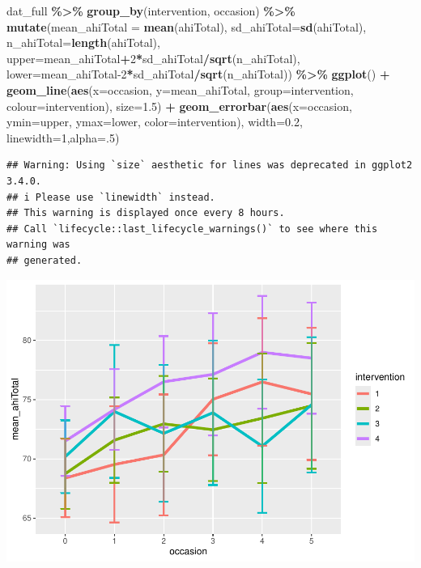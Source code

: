 \documentclass[
]{article}
\newenvironment{Shaded}{\begin{snugshade}}{\end{snugshade}}
\newcommand{\AttributeTok}[1]{\textcolor[rgb]{0.13,0.29,0.53}{#1}}
\newcommand{\DecValTok}[1]{\textcolor[rgb]{0.00,0.00,0.81}{#1}}
\newcommand{\FloatTok}[1]{\textcolor[rgb]{0.00,0.00,0.81}{#1}}
\newcommand{\FunctionTok}[1]{\textcolor[rgb]{0.13,0.29,0.53}{\textbf{#1}}}
\newcommand{\NormalTok}[1]{#1}
\newcommand{\SpecialCharTok}[1]{\textcolor[rgb]{0.81,0.36,0.00}{\textbf{#1}}}
\begin{document}
\begin{Shaded}
\begin{Highlighting}[]
\NormalTok{dat\_full }\SpecialCharTok{\%\textgreater{}\%}
  \FunctionTok{group\_by}\NormalTok{(intervention, occasion) }\SpecialCharTok{\%\textgreater{}\%}
  \FunctionTok{mutate}\NormalTok{(}\AttributeTok{mean\_ahiTotal =} \FunctionTok{mean}\NormalTok{(ahiTotal),}
         \AttributeTok{sd\_ahiTotal=}\FunctionTok{sd}\NormalTok{(ahiTotal),}
         \AttributeTok{n\_ahiTotal=}\FunctionTok{length}\NormalTok{(ahiTotal),}
         \AttributeTok{upper=}\NormalTok{mean\_ahiTotal}\SpecialCharTok{+}\DecValTok{2}\SpecialCharTok{*}\NormalTok{sd\_ahiTotal}\SpecialCharTok{/}\FunctionTok{sqrt}\NormalTok{(n\_ahiTotal),}
         \AttributeTok{lower=}\NormalTok{mean\_ahiTotal}\DecValTok{{-}2}\SpecialCharTok{*}\NormalTok{sd\_ahiTotal}\SpecialCharTok{/}\FunctionTok{sqrt}\NormalTok{(n\_ahiTotal)) }\SpecialCharTok{\%\textgreater{}\%}
  \FunctionTok{ggplot}\NormalTok{() }\SpecialCharTok{+} 
      \FunctionTok{geom\_line}\NormalTok{(}\FunctionTok{aes}\NormalTok{(}\AttributeTok{x=}\NormalTok{occasion, }
             \AttributeTok{y=}\NormalTok{mean\_ahiTotal, }
             \AttributeTok{group=}\NormalTok{intervention,}
             \AttributeTok{colour=}\NormalTok{intervention), }\AttributeTok{size=}\FloatTok{1.5}\NormalTok{) }\SpecialCharTok{+}
    \FunctionTok{geom\_errorbar}\NormalTok{(}\FunctionTok{aes}\NormalTok{(}\AttributeTok{x=}\NormalTok{occasion, }\AttributeTok{ymin=}\NormalTok{upper, }\AttributeTok{ymax=}\NormalTok{lower, }
                      \AttributeTok{color=}\NormalTok{intervention), }
                  \AttributeTok{width=}\FloatTok{0.2}\NormalTok{, }\AttributeTok{linewidth=}\DecValTok{1}\NormalTok{,}\AttributeTok{alpha=}\NormalTok{.}\DecValTok{5}\NormalTok{)}
\end{Highlighting}
\end{Shaded}

\begin{verbatim}
## Warning: Using `size` aesthetic for lines was deprecated in ggplot2 3.4.0.
## i Please use `linewidth` instead.
## This warning is displayed once every 8 hours.
## Call `lifecycle::last_lifecycle_warnings()` to see where this warning was
## generated.
\end{verbatim}

\includegraphics{RealData_example_files/figure-latex/unnamed-chunk-13-1.pdf}
\end{document}
